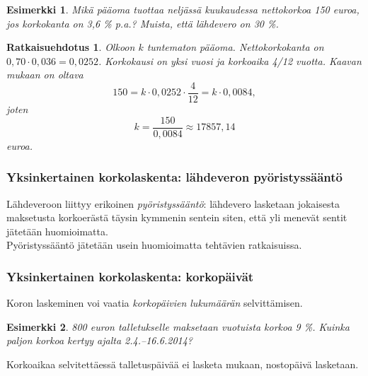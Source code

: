 \documentclass[]{beamer}\usepackage[]{graphicx}\usepackage[]{color}
\newtheorem{esim}{Esimerkki}
\newtheorem{ratkaisu}{Ratkaisuehdotus}
\newcommand{\pblock}{\\ \vspace{0.5cm}\pause}
\begin{document}
\begin{frame}
    \begin{esim}
        Mikä pääoma tuottaa neljässä kuukaudessa nettokorkoa 150 euroa, jos korkokanta on 3{,}6 \% p.a.? Muista, että lähdevero on 30 \%.
    \end{esim}\pause
    \begin{ratkaisu}
        Olkoon \(k\) tuntematon pääoma. \pause Nettokorkokanta on \(0,70\cdot0,036 = 0,0252\).
        \pause Korkokausi on yksi vuosi ja korkoaika 4/12 vuotta.
        \pause Kaavan mukaan on oltava
        \[
            150 = k\cdot 0,0252\cdot \frac{4}{12} = k\cdot 0,0084,
        \]
        \pause
        joten
        \[
            k = \frac{150}{0,0084}\approx 17857,14
        \]
        euroa.
    \end{ratkaisu}
\end{frame}

\begin{frame}
    \frametitle{Yksinkertainen korkolaskenta: lähdeveron pyöristyssääntö}
    \pause
    \pause
    Lähdeveroon liittyy erikoinen \emph{pyöristyssääntö}:
    lähdevero lasketaan jokaisesta maksetusta korkoerästä täysin kymmenin sentein siten,
    että yli menevät sentit jätetään huomioimatta.
    \pblock
    Pyöristyssääntö jätetään usein huomioimatta tehtävien ratkaisuissa.
\end{frame}

\begin{frame}
    \frametitle{Yksinkertainen korkolaskenta: korkopäivät}
    \pause
    Koron laskeminen voi vaatia \emph{korkopäivien lukumäärän} selvittämisen.
    \pause
    \begin{esim}
        800 euron talletukselle maksetaan vuotuista korkoa 9 \%. Kuinka paljon korkoa kertyy ajalta 2.4.--16.6.2014?
    \end{esim}
    \pause
    Korkoaikaa selvitettäessä talletuspäivää ei lasketa mukaan, nostopäivä lasketaan.
\end{frame}
\end{document}

